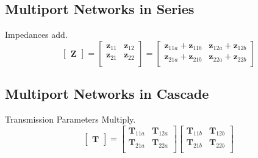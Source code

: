 	\subsection*{Multiport Networks in Series} \label{subsec:Series Multiport Networks}
	Impedances add.
		\begin{equation*} \label{eq:Series Multiport Networks}
			\begin{bmatrix}
				\mathbf{Z}
			\end{bmatrix}
			= \begin{bmatrix}
				\mathbf{z}_{11} & \mathbf{z}_{12} \\
				\mathbf{z}_{21} & \mathbf{z}_{22} \\
			\end{bmatrix}
			= \begin{bmatrix}
				\mathbf{z}_{11a}+\mathbf{z}_{11b} & \mathbf{z}_{12a}+\mathbf{z}_{12b} \\
				\mathbf{z}_{21a}+\mathbf{z}_{21b} & \mathbf{z}_{22a}+\mathbf{z}_{22b} \\
			\end{bmatrix}
		\end{equation*}	
	
	\subsection*{Multiport Networks in Cascade} \label{subsec:Cascade Multiport Networks}
	Transmission Parameters Multiply.
		\begin{equation*} \label{eq:Cascade Multiport Networks}
			\begin{bmatrix}
				\mathbf{T}
				\end{bmatrix}
			= \begin{bmatrix}
				\mathbf{T}_{11a} & \mathbf{T}_{12a} \\
				\mathbf{T}_{21a} & \mathbf{T}_{22a} \\
			\end{bmatrix}
			\begin{bmatrix}
				\mathbf{T}_{11b} & \mathbf{T}_{12b} \\
				\mathbf{T}_{21b} & \mathbf{T}_{22b} \\
			\end{bmatrix}
	\end{equation*}
	